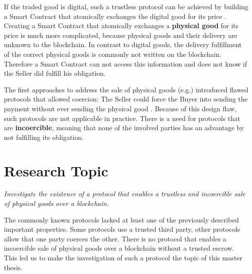 \documentclass{cacthesis}
\begin{document}
	If the traded good is digital, such a trustless protocol can be achieved by building a Smart Contract that atomically exchanges the digital good for its price \cite{asgaonkar_solving_2019}. Creating a Smart Contract that atomically exchanges a \textbf{physical good} for its price is much more complicated, because physical goods and their delivery are unknown to the blockchain. In contrast to digital goods, the delivery fulfillment of the correct physical goods is commonly not written on the blockchain. Therefore a Smart Contract can not access this information and does not know if the Seller did fulfill his obligation. \newline
	
	The first approaches to address the sale of physical goods (e.g.\cite{zimbeck_two_nodate}) introduced flawed protocols that allowed coercion: The Seller could force the Buyer into sending the payment without ever sending the physical good \cite{goharshady_irrationality_2021}. Because of this design flaw, such protocols are not applicable in practice. There is a need for protocols that are \textbf{incoercible}, meaning that none of the involved parties has an advantage by not fulfilling its obligation.\newline
	

	
	\section{Research Topic}

	\emph{Investigate the existence of a protocol that enables a trustless and incoercible sale of physical goods over a blockchain.}\newline
	
    The commonly known protocols lacked at least one of the previously described important properties. Some protocols use a trusted third party, other protocols allow that one party coerces the other. There is no protocol that enables a incoercible sale of physical goods over a blockchain without a trusted escrow. This led us to make the investigation of such a protocol the topic of this master thesis.\newline
    
\end{document}
